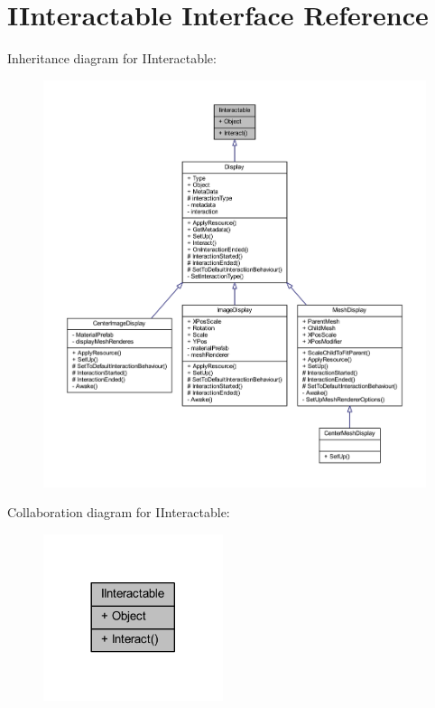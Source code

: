 \hypertarget{interface_i_interactable}{}\section{I\+Interactable Interface Reference}
\label{interface_i_interactable}


Inheritance diagram for I\+Interactable\+:
\nopagebreak
\begin{figure}[H]
\begin{center}
\leavevmode
\includegraphics[width=350pt]{interface_i_interactable__inherit__graph}
\end{center}
\end{figure}


Collaboration diagram for I\+Interactable\+:
\nopagebreak
\begin{figure}[H]
\begin{center}
\leavevmode
\includegraphics[width=149pt]{interface_i_interactable__coll__graph}
\end{center}
\end{figure}
